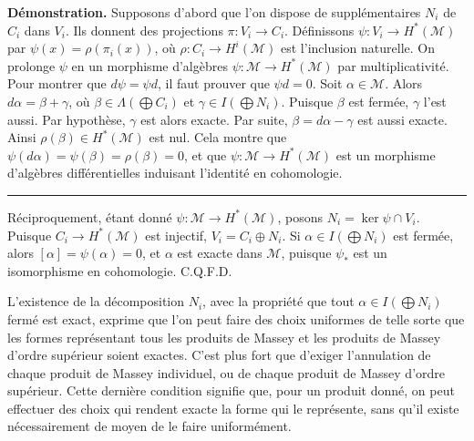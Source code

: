\documentclass[
  french,
  a3paper,
  a3paper]{extarticle}
\begin{document}
\textbf{Démonstration.} Supposons d'abord que l'on dispose de
supplémentaires \(N_i\) de \(C_i\) dans \(V_i\). Ils donnent des
projections \(\pi:V_i\longrightarrow C_i\). Définissons
\(\psi:V_i\longrightarrow H^*(\mathcal M)\) par
\(\psi(x)=\rho(\pi_i(x))\), où
\(\rho:C_i\longrightarrow H^i(\mathcal M)\) est l'inclusion naturelle.
On prolonge \(\psi\) en un morphisme d'algèbres
\(\psi:\mathcal M\longrightarrow H^*(\mathcal M)\) par multiplicativité.
Pour montrer que \(d\psi=\psi d\), il faut prouver que \(\psi d=0\).
Soit \(\alpha\in\mathcal M\). Alors \(d\alpha=\beta+\gamma\), où
\(\beta\in\Lambda(\bigoplus C_i)\) et \(\gamma\in I(\bigoplus N_i)\).
Puisque \(\beta\) est fermée, \(\gamma\) l'est aussi. Par hypothèse,
\(\gamma\) est alors exacte. Par suite, \(\beta=d\alpha-\gamma\) est
aussi exacte. Ainsi \(\rho(\beta)\in H^*(\mathcal M)\) est nul. Cela
montre que \(\psi(d\alpha)=\psi(\beta)=\rho(\beta)=0\), et que
\(\psi:\mathcal M\longrightarrow H^*(\mathcal M)\) est un morphisme
d'algèbres différentielles induisant l'identité en cohomologie.

\clearpage



\par

\vspace{0.7mm}\hrule\vspace{1.6mm}

\fontsize{9}{11}\selectfont

Réciproquement, étant donné
\(\psi:\mathcal M\longrightarrow H^*(\mathcal M)\), posons
\(N_i=\ker\psi\cap V_i\). Puisque \(C_i\longrightarrow H^*(\mathcal M)\)
est injectif, \(V_i=C_i\oplus N_i\). Si \(\alpha\in I(\bigoplus N_i)\)
est fermée, alors \([\alpha]=\psi(\alpha)=0\), et \(\alpha\) est exacte
dans \(\mathcal M\), puisque \(\psi_*\) est un isomorphisme en
cohomologie. C.Q.F.D.

L'existence de la décomposition \(N_i\), avec la propriété que tout
\(\alpha\in I(\bigoplus N_i)\) fermé est exact, exprime que l'on peut
faire des choix uniformes de telle sorte que les formes représentant
tous les produits de Massey et les produits de Massey d'ordre supérieur
soient exactes. C'est plus fort que d'exiger l'annulation de chaque
produit de Massey individuel, ou de chaque produit de Massey d'ordre
supérieur. Cette dernière condition signifie que, pour un produit donné,
on peut effectuer des choix qui rendent exacte la forme qui le
représente, sans qu'il existe nécessairement de moyen de le faire
uniformément.
\end{document}
